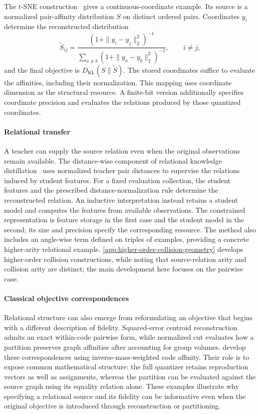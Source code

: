 The $t$-SNE construction~\citep{vandermaaten2008visualizing} gives a continuous-coordinate example.
Its source is a normalized pair-affinity distribution $S$ on distinct ordered pairs.
Coordinates $y_i$ determine the reconstructed distribution
\begin{equation}
\widetilde S_{ij}
=\frac{(1+\|y_i-y_j\|_2^2)^{-1}}
{\sum_{a\ne b}(1+\|y_a-y_b\|_2^2)^{-1}},
\qquad i\ne j,
\end{equation}
and the final objective is $D_{\mathrm{KL}}(S\|\widetilde S)$.
The stored coordinates suffice to evaluate the affinities, including their normalization.
This mapping uses coordinate dimension as the structural resource.
A finite-bit version additionally specifies coordinate precision and evaluates the relations produced by those quantized coordinates.

\paragraph{Relational transfer}
A teacher can supply the source relation even when the original observations remain available.
The distance-wise component of relational knowledge distillation~\citep{park2019relational} uses normalized teacher pair distances to supervise the relations induced by student features.
For a fixed evaluation collection, the student features and the prescribed distance-normalization rule determine the reconstructed relation.
An inductive interpretation instead retains a student model and computes the features from available observations.
The constrained representation is feature storage in the first case and the student model in the second; its size and precision specify the corresponding resource.
The method also includes an angle-wise term defined on triples of examples, providing a concrete higher-arity relational example.
\ref{app:higher-order-collision-geometry} develops higher-order collision constructions, while noting that source-relation arity and collision arity are distinct; the main development here focuses on the pairwise case.

\paragraph{Classical objective correspondences}
Relational structure can also emerge from reformulating an objective that begins with a different description of fidelity.
Squared-error centroid reconstruction admits an exact within-code pairwise form, while normalized cut evaluates how a partition preserves graph affinities after accounting for group volumes.
 develop these correspondences using inverse-mass-weighted code affinity.
Their role is to expose common mathematical structure: the full quantizer retains reproduction vectors as well as assignments, whereas the partition can be evaluated against the source graph using its equality relation alone.
These examples illustrate why specifying a relational source and its fidelity can be informative even when the original objective is introduced through reconstruction or partitioning.

